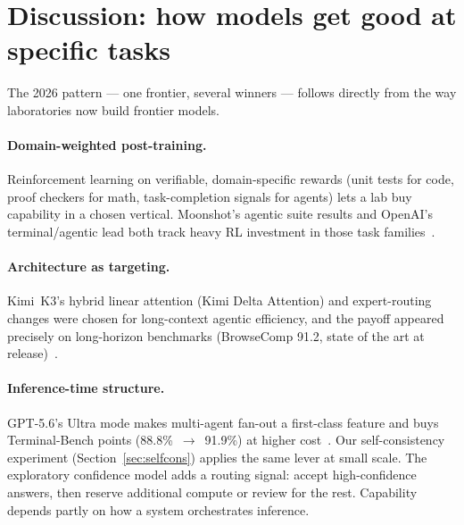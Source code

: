 \section{Discussion: how models get good at specific tasks}\label{sec:discussion}

The 2026 pattern --- one frontier, several winners --- follows directly
from the way laboratories now build frontier models.

\paragraph{Domain-weighted post-training.} Reinforcement learning on
verifiable, domain-specific rewards (unit tests for code, proof checkers for
math, task-completion signals for agents) lets a lab buy capability in a chosen
vertical. Moonshot's agentic suite results and OpenAI's terminal/agentic lead
both track heavy RL investment in those task
families~\cite{moonshot2026k3,openai2026gpt56}.

\paragraph{Architecture as targeting.} Kimi~K3's hybrid linear attention
(Kimi Delta Attention) and expert-routing changes were chosen for long-context
agentic efficiency, and the payoff appeared precisely on long-horizon
benchmarks (BrowseComp 91.2, state of the art at
release)~\cite{moonshot2026k3}.

\paragraph{Inference-time structure.} GPT-5.6's Ultra mode makes
multi-agent fan-out a first-class feature and buys Terminal-Bench points
(88.8\%~$\to$~91.9\%) at higher cost~\cite{openai2026gpt56}. Our
self-consistency experiment (Section~\ref{sec:selfcons}) applies the same lever
at small scale. The exploratory confidence model adds a routing signal: accept
high-confidence answers, then reserve additional compute or review for the
rest. Capability depends partly on how a system orchestrates inference.

